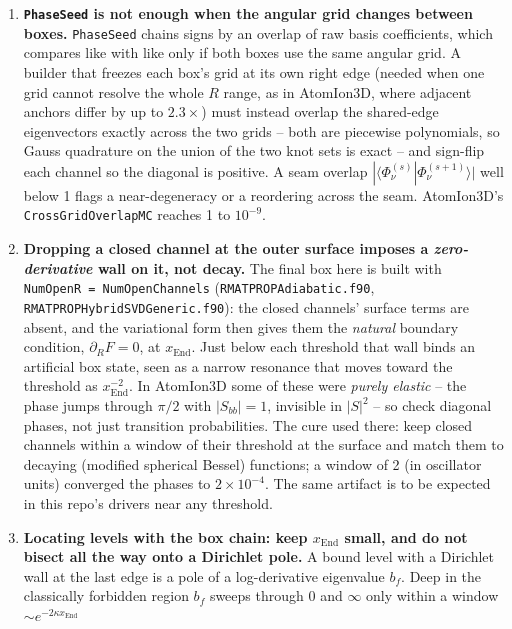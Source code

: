 \documentclass[11pt]{article}
\newcommand{\file}[1]{\texttt{#1}}
\newcommand{\sub}[1]{\texttt{#1}}
\begin{document}
\begin{enumerate}[leftmargin=*]
  recognize: per-box data correct in isolation, but the answer degrading \emph{non-monotonically}
  under refinement.
\item\label{got:crossgrid} \textbf{\texttt{PhaseSeed} is not enough when the angular grid changes
  between boxes.} \texttt{PhaseSeed} chains signs by an overlap of raw basis coefficients, which
  compares like with like only if both boxes use the same angular grid. A builder that freezes each
  box's grid at its own right edge (needed when one grid cannot resolve the whole $R$ range, as in
  AtomIon3D, where adjacent anchors differ by up to $2.3\times$) must instead overlap the shared-edge
  eigenvectors exactly across the two grids -- both are piecewise polynomials, so Gauss quadrature on
  the union of the two knot sets is exact -- and sign-flip each channel so the diagonal is positive.
  A seam overlap $|\langle\Phi_\nu^{(s)}|\Phi_\nu^{(s+1)}\rangle|$ well below 1 flags a
  near-degeneracy or a reordering across the seam. AtomIon3D's \sub{CrossGridOverlapMC} reaches 1
  to $10^{-9}$.
\item\label{got:closedsurf} \textbf{Dropping a closed channel at the outer surface imposes a
  \emph{zero-derivative} wall on it, not decay.} The final box here is built with
  \texttt{NumOpenR\,=\,NumOpenChannels} (\file{RMATPROPAdiabatic.f90},
  \file{RMATPROPHybridSVDGeneric.f90}): the closed channels' surface terms are absent, and the
  variational form then gives them the \emph{natural} boundary condition, $\partial_R F=0$, at
  $x_{\text{End}}$. Just below each threshold that wall binds an artificial box state, seen as a
  narrow resonance that moves toward the threshold as $x_{\text{End}}^{-2}$. In AtomIon3D some of these
  were \emph{purely elastic} -- the phase jumps through $\pi/2$ with $|S_{bb}|=1$, invisible in
  $|S|^{2}$ -- so check diagonal phases, not just transition probabilities. The cure used there:
  keep closed channels within a window of their threshold at the surface and match them to
  decaying (modified spherical Bessel) functions; a window of 2 (in oscillator units) converged the
  phases to $2\times10^{-4}$. The same artifact is to be expected in this repo's drivers near any
  threshold.
\item\label{got:dirpole} \textbf{Locating levels with the box chain: keep $x_{\text{End}}$ small,
  and do not bisect all the way onto a Dirichlet pole.} A bound level with a Dirichlet wall at the
  last edge is a pole of a log-derivative eigenvalue $b_f$. Deep in the classically forbidden
  region $b_f$ sweeps through $0$ and $\infty$ only within a window $\sim e^{-2\kappa x_{\text{End}}}$

\end{enumerate}
\end{document}
